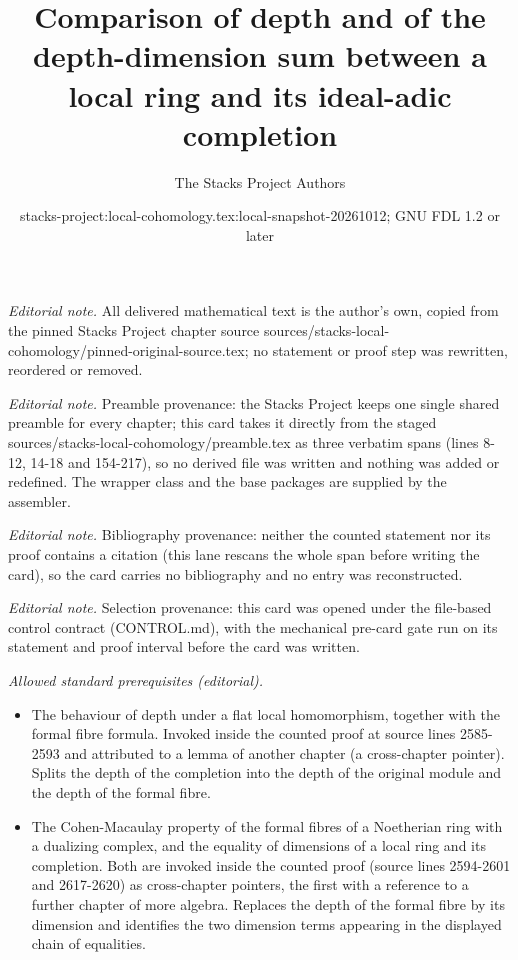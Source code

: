 \documentclass[10pt,a4paper]{amsart}
\title{Comparison of depth and of the depth-dimension sum between a local ring and its ideal-adic completion}
\author{The Stacks Project Authors}
\date{stacks-project:local-cohomology.tex:local-snapshot-20261012; GNU FDL 1.2 or later}
\theoremstyle{plain}
\theoremstyle{definition}
\theoremstyle{remark}
\numberwithin{equation}{subsection}
\begin{document}
\maketitle
\noindent\textit{Editorial note.} All delivered mathematical text is the author's own, copied from the pinned Stacks Project chapter source sources/stacks-local-cohomology/pinned-original-source.tex; no statement or proof step was rewritten, reordered or removed.\par\medskip
\noindent\textit{Editorial note.} Preamble provenance: the Stacks Project keeps one single shared preamble for every chapter; this card takes it directly from the staged sources/stacks-local-cohomology/preamble.tex as three verbatim spans (lines 8-12, 14-18 and 154-217), so no derived file was written and nothing was added or redefined. The wrapper class and the base packages are supplied by the assembler.\par\medskip
\noindent\textit{Editorial note.} Bibliography provenance: neither the counted statement nor its proof contains a citation (this lane rescans the whole span before writing the card), so the card carries no bibliography and no entry was reconstructed.\par\medskip
\noindent\textit{Editorial note.} Selection provenance: this card was opened under the file-based control contract (CONTROL.md), with the mechanical pre-card gate run on its statement and proof interval before the card was written.\par\medskip
\noindent\textit{Allowed standard prerequisites (editorial).}\begin{itemize}
\item The behaviour of depth under a flat local homomorphism, together with the formal fibre formula. Invoked inside the counted proof at source lines 2585-2593 and attributed to a lemma of another chapter (a cross-chapter pointer). Splits the depth of the completion into the depth of the original module and the depth of the formal fibre.
\item The Cohen-Macaulay property of the formal fibres of a Noetherian ring with a dualizing complex, and the equality of dimensions of a local ring and its completion. Both are invoked inside the counted proof (source lines 2594-2601 and 2617-2620) as cross-chapter pointers, the first with a reference to a further chapter of more algebra. Replaces the depth of the formal fibre by its dimension and identifies the two dimension terms appearing in the displayed chain of equalities.
\end{itemize}\medskip
\end{document}
